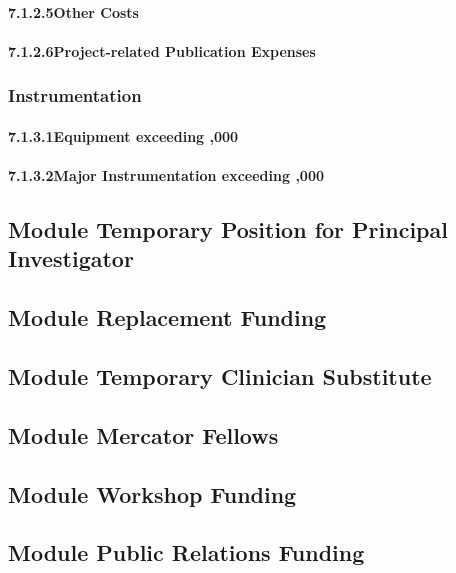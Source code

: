 \paragraph{7.1.2.5\quad Other Costs}

\paragraph{7.1.2.6\quad Project-related Publication Expenses}

\subsubsection{Instrumentation}

\paragraph{7.1.3.1\quad Equipment exceeding ,000}

\paragraph{7.1.3.2\quad Major Instrumentation exceeding ,000}

\subsection{Module Temporary Position for Principal Investigator}

\subsection{Module Replacement Funding}

\subsection{Module Temporary Clinician Substitute}

\subsection{Module Mercator Fellows}

\subsection{Module Workshop Funding}

\subsection{Module Public Relations Funding}

